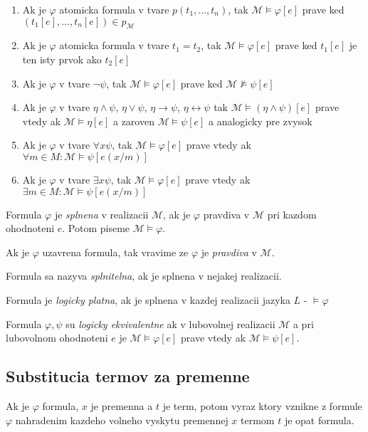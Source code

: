 \documentclass[12pt]{article}
\begin{document}
\begin{enumerate}
	\item Ak je $\varphi$ atomicka formula v tvare $p(t_{1},...,t_{n})$, tak
		$\mathcal{M} \models \varphi[e]$ prave ked $(t_{1}[e],...,t_{n}[e]) \in p_{\mathcal{M}}$
	\item Ak je $\varphi$ atomicka formula v tvare $t_{1} = t_{2}$, tak
		$\mathcal{M} \models \varphi[e]$ prave ked $t_{1}[e]$ je ten isty prvok ako $t_{2}[e]$
	\item Ak je $\varphi$ v tvare $\neg \psi$, tak 
		$\mathcal{M} \models \varphi[e]$ prave ked $\mathcal{M} \not\models \psi[e]$
	\item Ak je $\varphi$ v tvare $\eta \land \psi$, $\eta \lor \psi$, $\eta \to \psi$,
		$\eta \leftrightarrow \psi$ tak $\mathcal{M} \models (\eta \land \psi)[e]$ prave vtedy ak
		$\mathcal{M} \models \eta[e]$ a zaroven $\mathcal{M} \models \psi[e]$ a analogicky
		pre zvysok
	\item Ak je $\varphi$ v tvare $\forall x \psi$, tak
		$\mathcal{M} \models \varphi[e]$ prave vtedy ak
		$\forall m \in M : \mathcal{M} \models \psi[e(x/m)]$
	\item Ak je $\varphi$ v tvare $\exists x \psi$, tak
		$\mathcal{M} \models \varphi[e]$ prave vtedy ak
		$\exists m \in M : \mathcal{M} \models \psi[e(x/m)]$
\end{enumerate}
Formula $\varphi$ je \emph{splnena} v realizacii $\mathcal{M}$, ak je $\varphi$ pravdiva
v $\mathcal{M}$ pri kazdom ohodnoteni $e$. Potom piseme $\mathcal{M} \models \varphi$.

Ak je $\varphi$ uzavrena formula, tak vravime ze $\varphi$ je \emph{pravdiva} v $\mathcal{M}$.

Formula sa nazyva \emph{splnitelna}, ak je splnena v nejakej realizacii.

Formula je \emph{logicky platna}, ak je splnena v kazdej realizacii jazyka $L$ - $\models \varphi$

Formula $\varphi, \psi$ su \emph{logicky ekvivalentne} ak v lubovolnej realizacii $\mathcal{M}$
a pri lubovolnom ohodnoteni $e$ je $\mathcal{M} \models \varphi[e]$ prave vtedy ak
$\mathcal{M} \models \psi[e]$.

\subsection{Substitucia termov za premenne}
Ak je $\varphi$ formula, $x$ je premenna a $t$ je term, potom vyraz ktory vznikne z formule
$\varphi$ nahradenim kazdeho volneho vyskytu premennej $x$ termom $t$ je opat formula.
\end{document}
